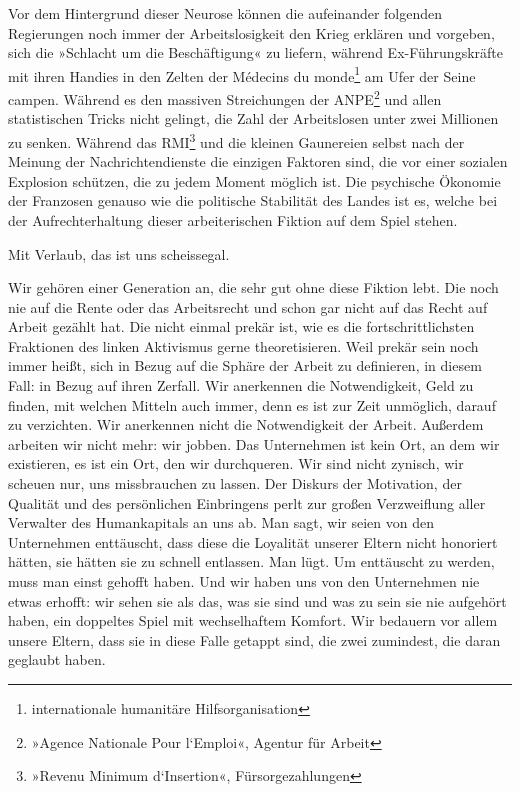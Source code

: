 Vor dem Hintergrund dieser Neurose können die aufeinander folgenden
Regierungen noch immer der Arbeitslosigkeit den Krieg erklären und
vorgeben, sich die »Schlacht um die Beschäftigung« zu liefern,
während Ex-Führungskräfte mit ihren Handies in den Zelten der
Médecins du monde\footnote{
internationale humanitäre Hilfsorganisation
}
am Ufer der Seine campen. Während es den
massiven Streichungen der ANPE\footnote{
»Agence Nationale Pour l‘Emploi«, Agentur für Arbeit
}
und allen statistischen Tricks
nicht gelingt, die Zahl der Arbeitslosen unter zwei Millionen zu
senken. Während das RMI\footnote{
»Revenu Minimum d‘Insertion«, Fürsorgezahlungen
}
und die kleinen Gaunereien selbst nach
der Meinung der Nachrichtendienste die einzigen Faktoren sind, die
vor einer sozialen Explosion schützen, die zu jedem Moment möglich
ist. Die psychische Ökonomie der Franzosen genauso wie die
politische Stabilität des Landes ist es, welche bei der
Aufrechterhaltung dieser arbeiterischen Fiktion auf dem Spiel
stehen.

Mit Verlaub, das ist uns scheissegal.

Wir gehören einer Generation an, die sehr gut ohne diese Fiktion
lebt. Die noch nie auf die Rente oder das Arbeitsrecht und schon
gar nicht auf das Recht auf Arbeit gezählt hat. Die nicht einmal
prekär ist, wie es die fortschrittlichsten Fraktionen des linken
Aktivismus gerne theoretisieren. Weil prekär sein noch immer heißt,
sich in Bezug auf die Sphäre der Arbeit zu definieren, in diesem
Fall: in Bezug auf ihren Zerfall. Wir anerkennen die Notwendigkeit,
Geld zu finden, mit welchen Mitteln auch immer, denn es ist zur
Zeit unmöglich, darauf zu verzichten. Wir anerkennen nicht die
Notwendigkeit der Arbeit. Außerdem arbeiten wir nicht mehr: wir
jobben. Das Unternehmen ist kein Ort, an dem wir existieren, es ist
ein Ort, den wir durchqueren. Wir sind nicht zynisch, wir scheuen
nur, uns missbrauchen zu lassen. Der Diskurs der Motivation, der
Qualität und des persönlichen Einbringens perlt zur großen
Verzweiflung aller Verwalter des Humankapitals an uns ab. Man sagt,
wir seien von den Unternehmen enttäuscht, dass diese die Loyalität
unserer Eltern nicht honoriert hätten, sie hätten sie zu schnell
entlassen. Man lügt. Um enttäuscht zu werden, muss man einst
gehofft haben. Und wir haben uns von den Unternehmen nie etwas
erhofft: wir sehen sie als das, was sie sind und was zu sein sie
nie aufgehört haben, ein doppeltes Spiel mit wechselhaftem Komfort.
Wir bedauern vor allem unsere Eltern, dass sie in diese Falle
getappt sind, die zwei zumindest, die daran geglaubt haben.

